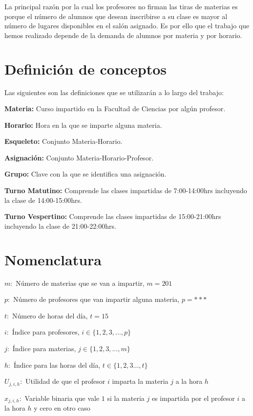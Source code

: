 La principal razón por la cual los profesores no firman las tiras de materias es porque el número de alumnos que desean inscribirse a su clase es mayor al número de lugares disponibles en el salón asignado. Es por ello que el trabajo que hemos realizado depende de la demanda de alumnos por materia y por horario.



\section{Definición de conceptos}

Las siguientes son las definiciones que se utilizarán a lo largo del trabajo:
  
\textbf{Materia:} Curso impartido en la Facultad de Ciencias por algún profesor.

\textbf{Horario:} Hora en la que se imparte alguna materia.

\textbf{Esqueleto:} Conjunto Materia-Horario.

\textbf{Asignación:} Conjunto Materia-Horario-Profesor.

\textbf{Grupo:} Clave con la que se identifica una asignación.

\textbf{Turno Matutino:} Comprende las clases impartidas de 7:00-14:00hrs incluyendo la clase de 14:00-15:00hrs.

\textbf{Turno Vespertino:} Comprende las clases impartidas de 15:00-21:00hrs incluyendo la clase de 21:00-22:00hrs.


\section{Nomenclatura}

$m:$ Número de materias que se van a impartir, $m = 201$

$p:$ Número de profesores que van impartir alguna materia, $p = ***$

$t:$ Número de horas del día, $t = 15$

$i:$ Índice para profesores, $i \in \{ 1, 2, 3, \ldots, p \}$
  
$j:$ Índice para materias, $j \in \{ 1, 2, 3, \ldots, m \}$
  
$h:$ Índice para las horas del día, $t \in \{ 1, 2, 3 \ldots, t\}$
  
$U_{j,i,h}:$ Utilidad de que el profesor $i$ imparta la materia $j$ a la hora $h$
  
$x_{j,i,h}:$ Variable binaria que vale $1$ si la materia $j$ es impartida por el profesor $i$ a la hora $h$ y cero en otro caso

